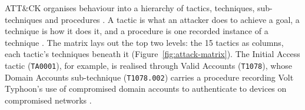 \documentclass{cshonours}
\newcommand{\attackid}[1]{\texttt{#1}}  %
\begin{document}
ATT\&CK organises behaviour into a hierarchy of tactics, techniques,
sub-techniques and procedures \citep{strom2018mitre}. A tactic is what an
attacker does to achieve a goal, a technique is how it does it, and a
procedure is one recorded instance of a technique \citep{rodriguez2024}.
The matrix lays out the top two levels: the 15 tactics as columns, each
tactic's techniques beneath it (Figure~\ref{fig:attack-matrix}). The
Initial Access tactic (\attackid{TA0001}), for example, is realised
through Valid Accounts (\attackid{T1078}), whose Domain Accounts
sub-technique (\attackid{T1078.002}) carries a procedure recording Volt
Typhoon's use of compromised domain accounts to authenticate to devices on
compromised networks \citep{mitre2026attackkb}.
\end{document}
